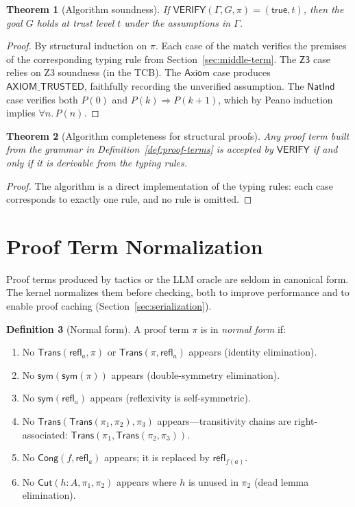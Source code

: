 \documentclass[11pt,a4paper]{report}
\theoremstyle{definition}
\newtheorem{definition}{Definition}[chapter]
\theoremstyle{plain}
\newtheorem{theorem}[definition]{Theorem}
\newcommand{\Refl}{\mathsf{refl}}
\newcommand{\sym}{\mathsf{sym}}
\newcommand{\Cut}{\mathsf{Cut}}
\newcommand{\Trans}{\mathsf{Trans}}
\newcommand{\Cong}{\mathsf{Cong}}
\begin{document}
\begin{theorem}[Algorithm soundness]
If $\mathsf{VERIFY}(\Gamma, G, \pi) = (\mathsf{true}, t)$, then the goal $G$
holds at trust level $t$ under the assumptions in $\Gamma$.
\end{theorem}
\begin{proof}
By structural induction on $\pi$.  Each case of the match verifies the
premises of the corresponding typing rule from Section~\ref{sec:middle-term}.
The $\mathsf{Z3}$ case relies on Z3 soundness (in the TCB).  The
$\mathsf{Axiom}$ case produces $\mathsf{AXIOM\_TRUSTED}$, faithfully recording
the unverified assumption.  The $\mathsf{NatInd}$ case verifies both $P(0)$ and
$P(k) \Rightarrow P(k+1)$, which by Peano induction implies $\forall n.\, P(n)$.
\end{proof}

\begin{theorem}[Algorithm completeness for structural proofs]
Any proof term built from the grammar in Definition~\ref{def:proof-terms} is
accepted by $\mathsf{VERIFY}$ if and only if it is derivable from the typing
rules.
\end{theorem}
\begin{proof}
The algorithm is a direct implementation of the typing rules: each case
corresponds to exactly one rule, and no rule is omitted.
\end{proof}



\section{Proof Term Normalization}
\label{sec:normalization}

Proof terms produced by tactics or the LLM oracle are seldom in canonical
form. The kernel normalizes them before checking, both to improve
performance and to enable proof caching (Section~\ref{sec:serialization}).

\begin{definition}[Normal form]
\label{def:normal-form}
A proof term $\pi$ is in \emph{normal form} if:
\begin{enumerate}
  \item No $\Trans(\Refl_a, \pi)$ or $\Trans(\pi, \Refl_a)$ appears
        (identity elimination).
  \item No $\sym(\sym(\pi))$ appears (double-symmetry elimination).
  \item No $\sym(\Refl_a)$ appears (reflexivity is self-symmetric).
  \item No $\Trans(\Trans(\pi_1, \pi_2), \pi_3)$ appears---transitivity
        chains are right-associated:
        $\Trans(\pi_1, \Trans(\pi_2, \pi_3))$.
  \item No $\Cong(f, \Refl_a)$ appears; it is replaced by $\Refl_{f(a)}$.
  \item No $\Cut(h : A, \pi_1, \pi_2)$ appears where $h$ is unused in
        $\pi_2$ (dead lemma elimination).
\end{enumerate}
\end{definition}
\end{document}
